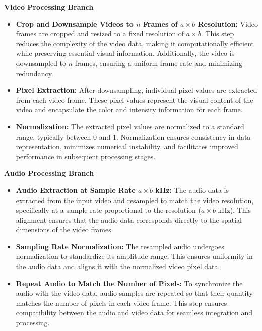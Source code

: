 \documentclass{ioereport}
\begin{document}
        \textbf{Video Processing Branch}
        \begin{itemize}
            \item \textbf{Crop and Downsample Videos to \(n\) Frames of \(a \times b\) Resolution:} 
            Video frames are cropped and resized to a fixed resolution of \(a \times b\). This step reduces the complexity of the video data, making it computationally efficient while preserving essential visual information. Additionally, the video is downsampled to \(n\) frames, ensuring a uniform frame rate and minimizing redundancy.
        
            \item \textbf{Pixel Extraction:} 
            After downsampling, individual pixel values are extracted from each video frame. These pixel values represent the visual content of the video and encapsulate the color and intensity information for each frame.
        
            \item \textbf{Normalization:} 
            The extracted pixel values are normalized to a standard range, typically between 0 and 1. Normalization ensures consistency in data representation, minimizes numerical instability, and facilitates improved performance in subsequent processing stages.
        \end{itemize}
        
        \textbf{Audio Processing Branch}
        \begin{itemize}
            \item \textbf{Audio Extraction at Sample Rate \(a \times b\) kHz:} 
            The audio data is extracted from the input video and resampled to match the video resolution, specifically at a sample rate proportional to the resolution (\(a \times b\) kHz). This alignment ensures that the audio data corresponds directly to the spatial dimensions of the video frames.
        
            \item \textbf{Sampling Rate Normalization:} 
            The resampled audio undergoes normalization to standardize its amplitude range. This ensures uniformity in the audio data and aligns it with the normalized video pixel data.
        
            \item \textbf{Repeat Audio to Match the Number of Pixels:} 
            To synchronize the audio with the video data, audio samples are repeated so that their quantity matches the number of pixels in each video frame. This step ensures compatibility between the audio and video data for seamless integration and processing.
        \end{itemize}
        
\end{document}
